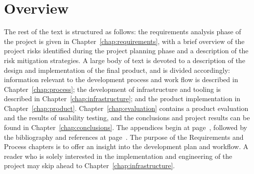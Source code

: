 \section*{Overview}\label{sec:overview}
The rest of the text is structured as follows: the requirements
analysis phase of the project is given in
Chapter~\ref{chap:requirements}, with a brief overview of the project
risks identified during the project planning phase and a description
of the risk mitigation strategies. A large body of text is devoted to
a description of the design and implementation of the final product,
and is divided accordingly: information relevant to the development
process and work flow is described in Chapter~\ref{chap:process}; the
development of infrastructure and tooling is described in
Chapter~\ref{chap:infrastructure}; and the product implementation in
Chapter~\ref{chap:product}. Chapter~\ref{chap:evaluation} contains a
product evaluation and the results of usability testing, and the
conclusions and project results can be found in
Chapter~\ref{chap:conclusions}. The appendices begin at
page~\pageref{appendices}, followed by the bibliography and references
at page~\pageref{bibliography}. The purpose of the Requirements and
Process chapters is to offer an insight into the development plan and
workflow. A reader who is solely interested in the implementation and
engineering of the project may skip ahead to
Chapter~\ref{chap:infrastructure}.

